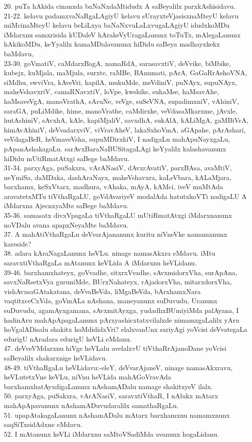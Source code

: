 \documentclass{article}
\begin{document}
20. puTa hAkida cinanxda baNaNxdaMtidudx A saBeyalilx parxkAshisidavu.\\
21-22. kelavu padamxvaNaRgaLAgiyU kelavu sUrayxteVjasisxnaMteyU kelavu miMcinaMteyU kelavu beLiLxya baNaNxvuLaLxvugaLAgiyU idudxkoMDu iMdarxnu samxrisida kUDaleV hArakeVyUragaLanunx toTuTx, mAlegaLanunx hAkikoMDu, keYyalilx kamaMDalavanunx hiDidu saBeya madhayxkekx baMdavu,\\
23-30. goVmatiV, caMdarxBagA, namaRdA, sarasavxtiV, deVvike, biMbike, kubejx, kuMjala, maMjula, surxte, raMBe, BAnumati, pArA, GaGaRrAshoVNA, siMdhu, swviVra, kAveVri, kapilA, mukuMde, meVdiniV, puNAyx, supuNAyx, maheVshavxriV, camaRNavxtiV, loVpe, kwshike, suhaMse, haMsavAhe, haMsaveVgA, manoVrathA, sAruNe, veVge, suSeVNA, supadimxniV, vAhiniV, saraGA, puLiMdike, hime, manoVrathe, caMdirxke, veVdasaMkarxme, jAvxle, hutAshiniV, sAvxhA, kAle, kapiMjaliV, savxdhA, sukAlA, kALiMgA, gaMBiVrA, himAvAhiniV, deVvadarxviV, viVravAheV, lakaSxhoVmA, aGApahe, pArAshari, veVdagaBeR, heVmaveVsha, supuMDirxkiV, I nadigaLu mahApuNayxgaLu, pApanAshakagaLu. sarAvxBaraNaBUSitagaLAgi keYyalilx kalashavanunx hiDidu mUtiRmatAtxgi saBege baMdavu.\\
31-34. parxyAga, puSakxra, vArANasiV, dAvxrAvatiV, parxBAsa, avaMtiV, neYmiSa, daMDaka, dashAraNayx, maheVshavxra, kaLeVbara, kALaMjara, barxhamx, keSxVtarx, madhura, vAhaka, mAyA, kAMci, iveV muMtAda aravatetxMTu tiVthaRgaLU, goVdAvariyeV modalAda hatutxkoVTi nadigaLU A iMdarxna AjecnxyaMte saBege baMdavu.\\
35-36. samasatx divxVpagaLa tiVthaRgaLU mUtiRmatAtxgi iMdarxnanunx noVDalu avana apapxNeyaMte baMdavu.\\
37. A mahAtiVthaRgaLu deVvarAjananunx kuritu niVneVke namamxnunx kareside?\\
38. adara kAraNagaLanunx heVLu. ninage namasAkxra eMdavu. iMtu saravxtiVthaRgaLa mAtanunx keVLida A iMdarxnu heVLidanu.\\
39-46. barxhamxhateyx, goVvadhe, sitxrxVvadhe, sAvxmidorxVha, surApAna, savxNaRsetxVya guruniMde, BUrxNahateyx, rAjadorxVha, mitarxdorxVha, vishAvxsaGAtakatana, deVvaBeVda, liMgaBeVda, bArxhamxNara vaqtitxceCxVda, goVmALa nAshana, maneyanunx suDuvudu, Uranunx suDuvudu, agamAyxgamana, sAvxmitAyxga, yudadhxBUmiyiMda palAyana, I hadinAru mahApApagaLanunx pArxyashicxtatxvilalxde nimamxgaLalilx yAru hoVgalADisalu shakitx hoMdididxVri? elalxvanUnx sariyAgi yoVcisi deVvategaLa edurigU nAradara edurigU heVLi eMdanu.\\
47. deVveVMdarxnu hiVge heVLalu avelalxvU tiVthaRrAjanoDane yoVcisi saBeyalilx shakarxnige heVLidavu.\\
48-49. tiVthaRgaLu heVLidavu:-eleY, deVvarAjaneV, ninage namasAkxravu, heVLutetxVne keVLu, niVnu heVLida mahAGoVravAda barxhamxhatAyxdigaLanunx nAshamADalu namage shakitxyeV ilalx.\\
50. parxyAga, puSakxra, vArANasiV, saravxtiVthaR, I nAlukx mAtarx mahApApavanunx nAshamADuvudaralilx samathaRgaLu.\\
51. upapAtakagaLanunx nAshamADalu mAtarx barxhamxnu namamxnunx saqSiTxsidAdxne eMdavu.\\
52. I mAtanunx keVLi iMdarxnu saMtoVSadiMda avanunx hogaLidanu.
\end{document}
